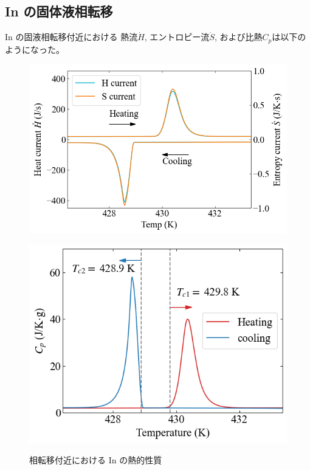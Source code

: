 \documentclass[9pt,dvipdfmx,a4paper]{jsarticle}
\begin{document}
\subsection{In の固体液相転移}
In の固液相転移付近における
熱流\(\dot{H}\), エントロピー流\(\dot{S}\), および比熱\(C_p\)は以下のようになった。
\begin{figure}[hbt]
    \centering
    \begin{minipage}[t]{0.52\columnwidth}
        \centering
        \includegraphics[width = \columnwidth]{result/In-current.png}
        \label{graph:In-current}
    \end{minipage}
    \hfill
    \begin{minipage}[t]{0.44\columnwidth}
        \centering
        \includegraphics[width = \columnwidth]{result/In-Cp.png}
        \label{graph:In-Cp}
    \end{minipage}
    \caption{相転移付近における In の熱的性質}
    \label{graph:In}
\end{figure}
\end{document}
